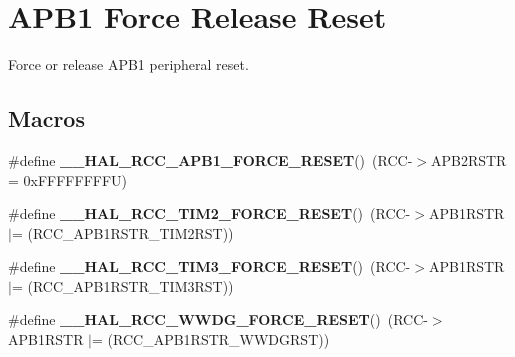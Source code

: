 \hypertarget{group___r_c_c___a_p_b1___force___release___reset}{}\section{A\+P\+B1 Force Release Reset}
\label{group___r_c_c___a_p_b1___force___release___reset}


Force or release A\+P\+B1 peripheral reset.  


\subsection*{Macros}
\begin{DoxyCompactItemize}
\item 
\mbox{\label{group___r_c_c___a_p_b1___force___release___reset_ga6f6e7048eca1abd1be132027f5b79465}} 
\#define {\bfseries \+\_\+\+\_\+\+H\+A\+L\+\_\+\+R\+C\+C\+\_\+\+A\+P\+B1\+\_\+\+F\+O\+R\+C\+E\+\_\+\+R\+E\+S\+ET}()~(R\+CC-\/$>$A\+P\+B2\+R\+S\+TR = 0x\+F\+F\+F\+F\+F\+F\+F\+F\+U)
\item 
\mbox{\label{group___r_c_c___a_p_b1___force___release___reset_ga1010b7c4a9122449860babb341f01d7b}} 
\#define {\bfseries \+\_\+\+\_\+\+H\+A\+L\+\_\+\+R\+C\+C\+\_\+\+T\+I\+M2\+\_\+\+F\+O\+R\+C\+E\+\_\+\+R\+E\+S\+ET}()~(R\+CC-\/$>$A\+P\+B1\+R\+S\+TR $\vert$= (R\+C\+C\+\_\+\+A\+P\+B1\+R\+S\+T\+R\+\_\+\+T\+I\+M2\+R\+ST))
\item 
\mbox{\label{group___r_c_c___a_p_b1___force___release___reset_ga80ff127f3c25bde58ee5c1f224e2dca4}} 
\#define {\bfseries \+\_\+\+\_\+\+H\+A\+L\+\_\+\+R\+C\+C\+\_\+\+T\+I\+M3\+\_\+\+F\+O\+R\+C\+E\+\_\+\+R\+E\+S\+ET}()~(R\+CC-\/$>$A\+P\+B1\+R\+S\+TR $\vert$= (R\+C\+C\+\_\+\+A\+P\+B1\+R\+S\+T\+R\+\_\+\+T\+I\+M3\+R\+ST))
\item 
\mbox{\label{group___r_c_c___a_p_b1___force___release___reset_gaf60e74dcb0fdadafd6b4762aa81fc409}} 
\#define {\bfseries \+\_\+\+\_\+\+H\+A\+L\+\_\+\+R\+C\+C\+\_\+\+W\+W\+D\+G\+\_\+\+F\+O\+R\+C\+E\+\_\+\+R\+E\+S\+ET}()~(R\+CC-\/$>$A\+P\+B1\+R\+S\+TR $\vert$= (R\+C\+C\+\_\+\+A\+P\+B1\+R\+S\+T\+R\+\_\+\+W\+W\+D\+G\+R\+ST))
\item 

\end{DoxyCompactItemize}
